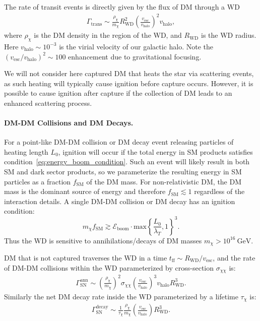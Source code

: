 \documentclass[preprintnumbers,amsmath,amssymb,prd,superscriptaddress]{revtex4}
\newcommand{\Eboom}{\mathcal{E}_\text{boom}}
\newcommand{\GeV}{\text{GeV}}
\def\r{\right)}
\def\l{\left(}
\begin{document}
The rate of transit events is directly given by the flux of DM through a WD
\begin{align}
  \Gamma_\text{trans} \sim
  \frac{\rho_{\chi}}{m_\chi} R_\text{WD}^2
  \l\frac{v_\text{esc}}{v_\text{halo}}\r^2 v_\text{halo},
\label{eq:TransitRate}
\end{align}
where $\rho_\chi$ is the DM density in the region of the WD, and $R_\text{WD}$ is the WD radius.
Here $v_\text{halo} \sim 10^{-3}$ is the virial velocity of our galactic halo.
Note the $(v_\text{esc}/v_\text{halo})^2 \sim 100$ enhancement due to gravitational focusing.

We will not consider here captured DM that heats the star via scattering events, as such heating will typically cause ignition before capture occurs.
However, it is possible to cause ignition after capture if the collection of DM leads to an enhanced scattering process.

\paragraph{DM-DM Collisions and DM Decays.}

For a point-like DM-DM collision or DM decay event releasing particles of heating length $L_0$, ignition will occur if the total energy in SM products satisfies condition~\eqref{eq:energy_boom_condition}.
Such an event will likely result in both SM and dark sector products, so we parameterize the resulting energy in SM particles as a fraction $f_\text{SM}$ of the DM mass.
For non-relativistic DM, the DM mass is the dominant source of energy and therefore $f_\text{SM} \lesssim 1$ regardless of the interaction details.
A single DM-DM collision or DM decay has an ignition condition:
\begin{equation}
\label{eq:coldecay}
  m_\chi f_\text{SM} \gtrsim \Eboom \cdot \text{max} \left \{\frac{L_0}{\lambda_T}, 1 \right \}^3.
\end{equation}
Thus the WD is sensitive to annihilations/decays of DM masses $m_\chi > 10^{16} ~\GeV$.

DM that is not captured traverses the WD in a time $t_\text{ff} \sim R_\text{WD}/v_\text{esc}$, and the rate of DM-DM collisions within the WD parameterized by cross-section $\sigma_{\chi \chi}$ is:
\begin{align}
  \Gamma^\text{ann}_\text{SN}
  \sim \l \frac{\rho_\chi}{m_\chi} \r^2 \sigma_{\chi \chi} \l \frac{v_\text{esc}}{v_\text{halo}}\r^3 v_\text{halo} R_\text{WD}^3.
  \label{eq:collisionDM}
\end{align}
Similarly the net DM decay rate inside the WD parameterized by a lifetime $\tau_\chi$ is:
\begin{align}
 \Gamma^\text{decay}_\text{SN}
   \sim \frac{1}{\tau_\chi} \frac{\rho_{\chi}}{m_\chi} \l \frac{v_\text{esc}}{v_\text{halo}}\r R_\text{WD}^3.
  \label{eq:decayDM}
\end{align}
\end{document}
